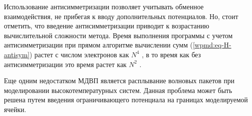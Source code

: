 Использование антисимметризации позволяет учитывать обменное взаимодействия, не прибегая к вводу дополнительных потенциалов. Но, стоит отметить, что введение антисимметризации приводит к возрастанию вычислительной сложности метода. Время выполнения программы с учетом антисимметризации при прямом алгоритме вычислении сумм (\ref{wpmd:eq-H-antisym}) растет с числом электронов как $N^4$ , в то время как без антисимметризации это время растет как $N^2$ . 

Еще одним недостатком МДВП является расплывание волновых пакетов при моделировании высокотемпературных систем. Данная проблема может быть решена путем введения ограничивающего потенциала на границах моделируемой ячейки. 